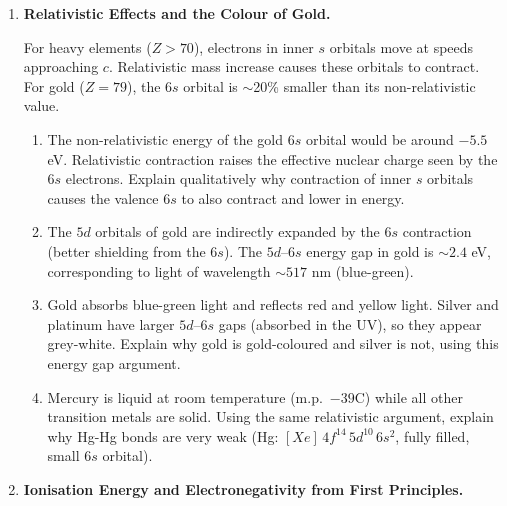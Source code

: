 \documentclass[12pt, a4paper]{book}
\begin{document}
\begin{deepbox}
\begin{enumerate}[label=\textbf{D\arabic*.}]

  \item \textbf{Relativistic Effects and the Colour of Gold.}

        For heavy elements ($Z > 70$), electrons in inner
        $s$ orbitals move at speeds approaching $c$.
        Relativistic mass increase causes these orbitals
        to contract.
        For gold ($Z=79$), the $6s$ orbital is $\sim$20\%
        smaller than its non-relativistic value.

        \begin{enumerate}[label=(\alph*)]
          \item The non-relativistic energy of the gold
                $6s$ orbital would be around $-5.5$ eV.
                Relativistic contraction raises the effective
                nuclear charge seen by the $6s$ electrons.
                Explain qualitatively why contraction of inner
                $s$ orbitals causes the valence $6s$ to
                also contract and lower in energy.
          \item The $5d$ orbitals of gold are indirectly
                expanded by the $6s$ contraction
                (better shielding from the $6s$).
                The $5d$--$6s$ energy gap in gold is
                $\sim 2.4$ eV, corresponding to light
                of wavelength $\sim 517$ nm (blue-green).
          \item Gold absorbs blue-green light and reflects
                red and yellow light.
                Silver and platinum have larger $5d$--$6s$
                gaps (absorbed in the UV), so they appear
                grey-white.
                Explain why gold is gold-coloured and silver
                is not, using this energy gap argument.
          \item Mercury is liquid at room temperature
                (m.p.\ $-39$\textdegree C) while all other
                transition metals are solid.
                Using the same relativistic argument,
                explain why Hg-Hg bonds are very weak
                (Hg: $[Xe]\,4f^{14}\,5d^{10}\,6s^2$,
                fully filled, small $6s$ orbital).
        \end{enumerate}

  \item \textbf{Ionisation Energy and Electronegativity from First Principles.}


\end{enumerate}
\end{deepbox}
\end{document}
